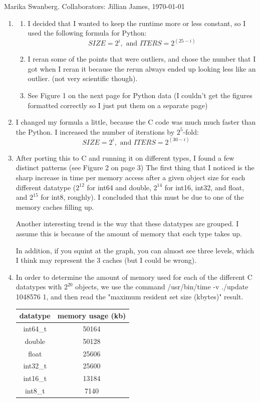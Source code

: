\documentclass[12pt]{article}
\author{Marika Swanberg}
\begin{document}
Marika Swanberg. Collaborators: Jillian James, \today
\bigskip 

\begin{enumerate}
\item 
\begin{enumerate}
\item I decided that I wanted to keep the runtime more or less constant, so I used the following formula for Python:
\begin{equation*}
SIZE = 2^i, \text{ and }
ITERS = 2^{(25-i)}
\end{equation*}
\item I reran some of the points that were outliers, and chose the number that I got when I reran it because the rerun always ended up looking less like an outlier. (not very scientific though).
\item See Figure 1 on the next page for Python data (I couldn't get the figures formatted correctly so I just put them on a separate page)
\end{enumerate}
\item I changed my formula a little, because the C code was much much faster than the Python. I increased the number of iterations by $2^5$-fold:
\begin{equation*}
SIZE = 2^i, \text{ and }
ITERS = 2^{(30-i)}
\end{equation*}
\item After porting this to C and running it on different types, I found a few distinct patterns (see Figure 2 on page 3) The first thing that I noticed is the sharp increase in time per memory access after a given object size for each different datatype ($2^{12}$ for int64 and double, $2^{14}$ for int16, int32, and float, and $2^{15}$ for int8, roughly). I concluded that this must be due to one of the memory caches filling up. 

Another interesting trend is the way that these datatypes are grouped. I assume this is because of the amount of memory that each type takes up.

In addition, if you squint at the graph, you can almost see three levels, which I think may represent the 3 caches (but I could be wrong).

\item In order to determine the amount of memory used for each of the different C datatypes with $2^{20}$ objects, we use the command /usr/bin/time -v ./update 1048576 1, and then read the "maximum resident set size (kbytes)" result.

\begin{center}
\begin{tabular} {| c | c |} 
\hline
datatype & memory usage (kb) \\
\hline
int64\_t & 50164 \\
double & 50128 \\
\hline
float & 25606 \\
int32\_t & 25600 \\
\hline
int16\_t & 13184 \\
\hline
int8\_t & 7140 \\
\hline
\end{tabular}
\end{center}


\end{enumerate}
\end{document}
